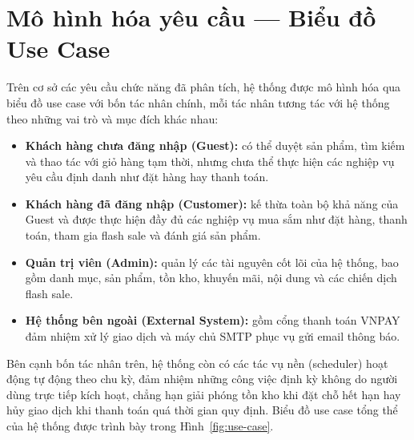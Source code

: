 \documentclass[../DoAn.tex]{subfiles}
\begin{document}
{%

\section{Mô hình hóa yêu cầu --- Biểu đồ Use Case}
\label{section:4.2}

Trên cơ sở các yêu cầu chức năng đã phân tích, hệ thống được mô hình hóa qua biểu đồ use case
với bốn tác nhân chính, mỗi tác nhân tương tác với hệ thống theo những vai trò và mục đích
khác nhau:

\begin{itemize}[noitemsep]
    \item \textbf{Khách hàng chưa đăng nhập (Guest):} có thể duyệt sản phẩm, tìm kiếm và
          thao tác với giỏ hàng tạm thời, nhưng chưa thể thực hiện các nghiệp vụ yêu cầu định
          danh như đặt hàng hay thanh toán.
    \item \textbf{Khách hàng đã đăng nhập (Customer):} kế thừa toàn bộ khả năng của Guest và
          được thực hiện đầy đủ các nghiệp vụ mua sắm như đặt hàng, thanh toán, tham gia flash
          sale và đánh giá sản phẩm.
    \item \textbf{Quản trị viên (Admin):} quản lý các tài nguyên cốt lõi của hệ thống, bao
          gồm danh mục, sản phẩm, tồn kho, khuyến mãi, nội dung và các chiến dịch flash sale.
    \item \textbf{Hệ thống bên ngoài (External System):} gồm cổng thanh toán VNPAY đảm nhiệm
          xử lý giao dịch và máy chủ SMTP phục vụ gửi email thông báo.
\end{itemize}

Bên cạnh bốn tác nhân trên, hệ thống còn có các tác vụ nền (scheduler) hoạt động tự động theo
chu kỳ, đảm nhiệm những công việc định kỳ không do người dùng trực tiếp kích hoạt, chẳng hạn
giải phóng tồn kho khi đặt chỗ hết hạn hay hủy giao dịch khi thanh toán quá thời gian quy
định. Biểu đồ use case tổng thể của hệ thống được trình bày trong Hình~\ref{fig:use-case}.

}
\end{document}

